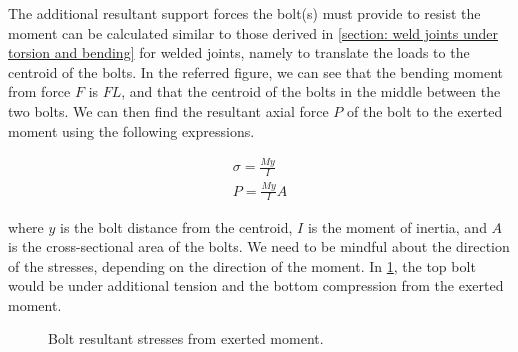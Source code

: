 \documentclass[
10pt,
a4paper,
openany,
svgnames,
]{book}
\begin{document}
The additional resultant support forces the bolt(s) must provide to resist the moment can be calculated similar to those derived in \cref{section: weld joints under torsion and bending} for welded joints, namely to translate the loads to the centroid of the bolts. In the referred figure, we can see that the bending moment from force $F$ is $FL$, and that the centroid of the bolts in the middle between the two bolts. We can then find the resultant axial force $P$ of the bolt to the exerted moment using the following expressions.

\begin{align}
  \label{eq: bolted stress under bending}
  \sigma = \frac{My}{I} \\
  P = \frac{My}{I} A
\end{align}

where $y$ is the bolt distance from the centroid, $I$ is the moment of inertia, and $A$ is the cross-sectional area of the bolts. We need to be mindful about the direction of the stresses, depending on the direction of the moment. In \cref{fig: bolted joint under bending}, the top bolt would be under additional tension and the bottom compression from the exerted moment. 

\begin{figure}[H]
  \centering
  \caption{Bolt resultant stresses from exerted moment.}
  \label{fig: bolted joint under bending}
\end{figure}
\end{document}
